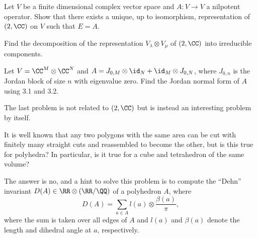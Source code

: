 \documentclass{article}
\begin{document}
\begin{prb}
Let $V$ be a finite dimensional complex vector space and $A : V \to V$ a
nilpotent operator. Show that there exists a unique, up to isomorphism,
representation of $\sl(2, \CC)$ on $V$ such that $E = A$.
\end{prb}

\begin{prb}
Find the decomposition of the representation $V_{\lambda} \otimes V_{\mu}$ of
$\sl(2, \CC)$ into irreducible components.
\end{prb}

\begin{prb}
Let $V = \CC^M \otimes \CC^N$ and $A = J_{0, M} \otimes \id_N + \id_M \otimes
J_{0, N}$, where $J_{0, n}$ is the Jordan block of size $n$ with eigenvalue
zero. Find the Jordan normal form of $A$ using 3.1 and 3.2.
\end{prb}

The last problem is not related to $\sl(2, \CC)$ but is instead an interesting
problem by itself.

\begin{prb}
It is well known that any two polygons with the same area can be cut with
finitely many straight cuts and reassembled to become the other, but is this
true for polyhedra? In particular, is it true for a cube and tetrahedron of the
same volume?

The answer is no, and a hint to solve this problem is to compute the ``Dehn''
invariant $D(A) \in \RR \otimes (\RR / \QQ)$ of a polyhedron $A$, where
\[ D(A) = \sum_{a \in A} l(a) \otimes \frac{\beta(a)}{\pi}, \]
where the sum is taken over all edges of $A$ and $l(a)$ and $\beta(a)$ denote
the length and dihedral angle at $a$, respectively.
\end{prb}
\end{document}
